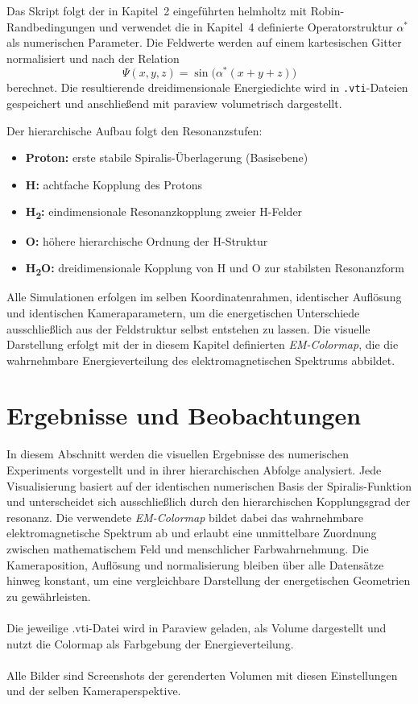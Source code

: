 Das Skript folgt der in Kapitel~2 eingeführten \gls{helmholtz} mit Robin-Randbedingungen und verwendet die in Kapitel~4 definierte Operatorstruktur \(\alpha^*\) als numerischen Parameter. Die Feldwerte werden auf einem kartesischen Gitter normalisiert und nach der Relation
\[
\Psi(x,y,z) = \sin\!\bigl(\alpha^*(x+y+z)\bigr)
\]
berechnet. Die resultierende dreidimensionale Energiedichte wird in \texttt{.vti}-Dateien gespeichert und anschließend mit \gls{paraview} volumetrisch dargestellt.

Der hierarchische Aufbau folgt den Resonanzstufen:
\begin{itemize}
  \item \textbf{Proton:} erste stabile Spiralis-Überlagerung (Basisebene)
  \item \textbf{H:} achtfache Kopplung des Protons
  \item \textbf{H\textsubscript{2}:} eindimensionale Resonanzkopplung zweier H-Felder
  \item \textbf{O:} höhere hierarchische Ordnung der H-Struktur
  \item \textbf{H\textsubscript{2}O:} dreidimensionale Kopplung von H und O zur stabilsten Resonanzform
\end{itemize}

Alle Simulationen erfolgen im selben Koordinatenrahmen, identischer Auflösung und identischen Kameraparametern, um die energetischen Unterschiede ausschließlich aus der Feldstruktur selbst entstehen zu lassen. Die visuelle Darstellung erfolgt mit der in diesem Kapitel definierten \textit{EM-Colormap}, die die wahrnehmbare Energieverteilung des elektromagnetischen Spektrums abbildet.

\newpage

\section{Ergebnisse und Beobachtungen}
In diesem Abschnitt werden die visuellen Ergebnisse des numerischen Experiments vorgestellt und in ihrer hierarchischen Abfolge analysiert.
Jede Visualisierung basiert auf der identischen numerischen Basis der Spiralis-Funktion und unterscheidet sich ausschließlich durch den hierarchischen Kopplungsgrad der \gls{resonanz}. 
Die verwendete \textit{EM-Colormap} bildet dabei das wahrnehmbare elektromagnetische Spektrum ab und erlaubt eine unmittelbare Zuordnung zwischen mathematischem Feld und menschlicher Farbwahrnehmung. 
Die Kameraposition, Auflösung und \gls{normalisierung} bleiben über alle Datensätze hinweg konstant, um eine vergleichbare Darstellung der energetischen Geometrien zu gewährleisten.
\\
\\
Die jeweilige .vti-Datei wird in Paraview geladen, als Volume dargestellt und nutzt die Colormap als Farbgebung der Energieverteilung.
\\
\\
Alle Bilder sind Screenshots der gerenderten Volumen mit diesen Einstellungen und der selben Kameraperspektive.

